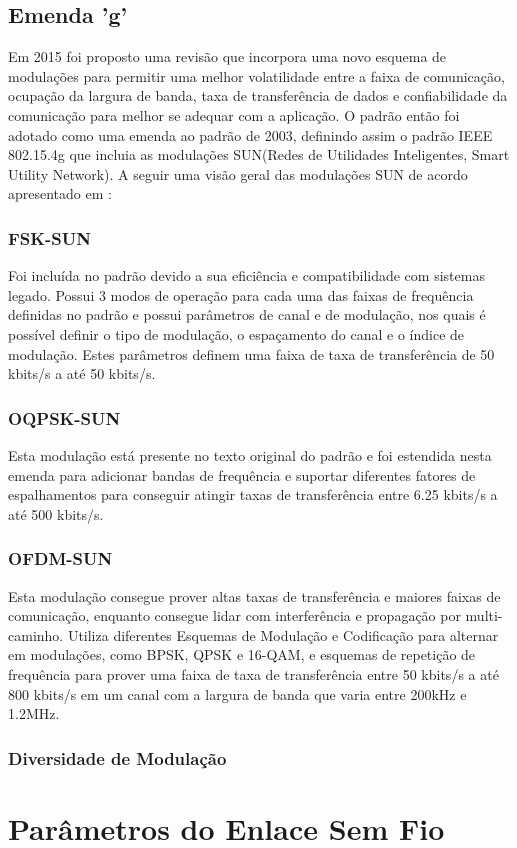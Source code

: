 \subsection*{Emenda 'g'}
Em 2015 foi proposto uma revisão que incorpora uma novo esquema de modulações para permitir uma melhor volatilidade entre a faixa de comunicação, ocupação da largura de banda, taxa de transferência de dados e confiabilidade da comunicação para melhor se adequar com a aplicação. O padrão então foi adotado como uma emenda ao padrão de 2003, definindo assim o padrão IEEE 802.15.4g que incluia as modulações SUN(Redes de Utilidades Inteligentes, Smart Utility Network)\cite{tuset2020reliability}.
A seguir uma visão geral das modulações SUN de acordo apresentado em \cite{tuset2020reliability}:
\subsubsection*{FSK-SUN}
Foi incluída no padrão devido a sua eficiência e compatibilidade com sistemas legado. Possui 3 modos de operação para cada uma das faixas de frequência definidas no padrão e possui parâmetros de canal e de modulação, nos quais é possível definir o tipo de modulação, o espaçamento do canal e o índice de modulação. Estes parâmetros definem uma faixa de taxa de transferência de 50 kbits/s a até 50 kbits/s.
\subsubsection*{OQPSK-SUN}
Esta modulação está presente no texto original do padrão e foi estendida nesta emenda para adicionar bandas de frequência e suportar diferentes fatores de espalhamentos para conseguir atingir taxas de transferência entre 6.25 kbits/s a até 500 kbits/s.
\subsubsection*{OFDM-SUN}
Esta modulação consegue prover altas taxas de transferência e maiores faixas de comunicação, enquanto consegue lidar com interferência e propagação por multi-caminho. Utiliza diferentes Esquemas de Modulação e Codificação para alternar em modulações, como BPSK, QPSK e 16-QAM, e esquemas de repetição de frequência para prover uma faixa de taxa de transferência entre 50 kbits/s a até 800 kbits/s em um canal com a largura de banda que varia entre 200kHz e 1.2MHz.

\subsubsection*{Diversidade de Modulação}



\section{Parâmetros do Enlace Sem Fio}
\label{paramSF}


